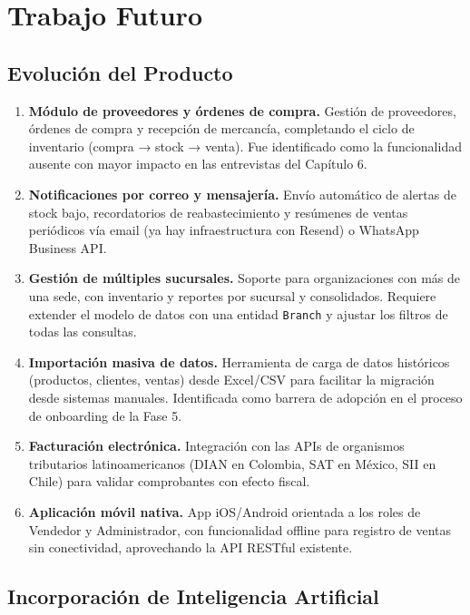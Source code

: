 \section{Trabajo Futuro}\label{trabajo-futuro}

\subsection{Evolución del Producto}\label{evoluciuxf3n-del-producto}

\begin{enumerate}
\def\labelenumi{\arabic{enumi}.}
\item
  \textbf{Módulo de proveedores y órdenes de compra.} Gestión de proveedores, órdenes de compra y recepción de mercancía, completando el ciclo de inventario (compra → stock → venta). Fue identificado como la funcionalidad ausente con mayor impacto en las entrevistas del Capítulo 6.
\item
  \textbf{Notificaciones por correo y mensajería.} Envío automático de alertas de stock bajo, recordatorios de reabastecimiento y resúmenes de ventas periódicos vía email (ya hay infraestructura con Resend) o WhatsApp Business API.
\item
  \textbf{Gestión de múltiples sucursales.} Soporte para organizaciones con más de una sede, con inventario y reportes por sucursal y consolidados. Requiere extender el modelo de datos con una entidad \texttt{Branch} y ajustar los filtros de todas las consultas.
\item
  \textbf{Importación masiva de datos.} Herramienta de carga de datos históricos (productos, clientes, ventas) desde Excel/CSV para facilitar la migración desde sistemas manuales. Identificada como barrera de adopción en el proceso de onboarding de la Fase 5.
\item
  \textbf{Facturación electrónica.} Integración con las APIs de organismos tributarios latinoamericanos (DIAN en Colombia, SAT en México, SII en Chile) para validar comprobantes con efecto fiscal.
\item
  \textbf{Aplicación móvil nativa.} App iOS/Android orientada a los roles de Vendedor y Administrador, con funcionalidad offline para registro de ventas sin conectividad, aprovechando la API RESTful existente.
\end{enumerate}

\subsection{Incorporación de Inteligencia Artificial}\label{incorporaciuxf3n-de-inteligencia-artificial}

